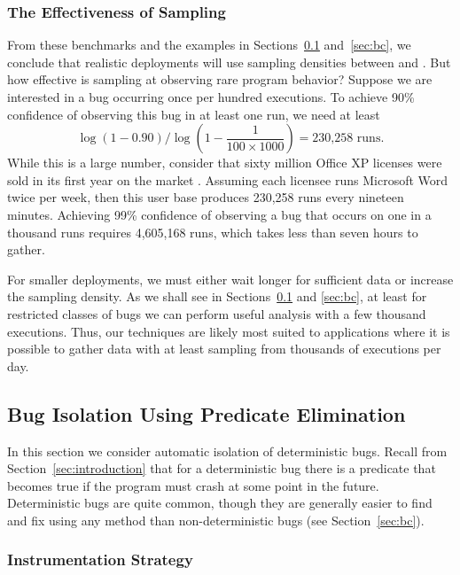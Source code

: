 \subsubsection{The Effectiveness of Sampling}

From these benchmarks and the examples in Sections~\ref{sec:ccrypt}
and~\ref{sec:bc}, we conclude that realistic deployments will use
sampling densities between  and .
But how effective is  sampling at observing rare
program behavior?  Suppose we are interested in a bug occurring once
per hundred executions.  To achieve 90\% confidence of observing this
bug in at least one run, we need at least
\[\log{(1-0.90)} / \log{\left( 1 - \frac{1}{100 \times 1000}\right)} = \text{230,258 runs.}\]
While this is a large number, consider that sixty million Office XP
licenses were sold in its first year on the market
\cite{Microsoft:2002:AR-F10K}.  Assuming each licensee runs Microsoft
Word twice per week, then this user base produces 230,258 runs every
nineteen minutes.  Achieving 99\% confidence of observing a 
bug that occurs on one in a thousand runs requires 4,605,168 runs, 
which takes less than seven hours to gather.  

For smaller deployments, we must either wait longer for sufficient
data or increase the sampling density.  As we shall see in
Sections~\ref{sec:ccrypt} and \ref{sec:bc}, at least for restricted
classes of bugs we can perform useful analysis with a few thousand
executions.  Thus, our techniques are likely most suited to
applications where it is possible to gather data with at least   sampling from thousands of executions per day.


\subsection{Bug Isolation Using Predicate Elimination}
\label{sec:ccrypt}

In this section we consider automatic isolation of deterministic
bugs.  Recall from Section~\ref{sec:introduction} that for a deterministic
bug there is a predicate that becomes true
if the program must crash at some point in the future.
Deterministic bugs are quite common, though they are generally easier
to find and fix using any method than non-deterministic bugs (see
Section~\ref{sec:bc}).

\subsubsection{Instrumentation Strategy}

